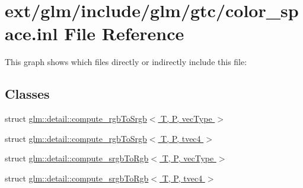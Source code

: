 \hypertarget{gtc_2color__space_8inl}{\section{ext/glm/include/glm/gtc/color\-\_\-space.inl File Reference}
\label{gtc_2color__space_8inl}
}
This graph shows which files directly or indirectly include this file\-:
\subsection*{Classes}
\begin{DoxyCompactItemize}
\item 
struct \hyperlink{structglm_1_1detail_1_1compute__rgb_to_srgb}{glm\-::detail\-::compute\-\_\-rgb\-To\-Srgb$<$ T, P, vec\-Type $>$}
\item 
struct \hyperlink{structglm_1_1detail_1_1compute__rgb_to_srgb_3_01_t_00_01_p_00_01tvec4_01_4}{glm\-::detail\-::compute\-\_\-rgb\-To\-Srgb$<$ T, P, tvec4 $>$}
\item 
struct \hyperlink{structglm_1_1detail_1_1compute__srgb_to_rgb}{glm\-::detail\-::compute\-\_\-srgb\-To\-Rgb$<$ T, P, vec\-Type $>$}
\item 
struct \hyperlink{structglm_1_1detail_1_1compute__srgb_to_rgb_3_01_t_00_01_p_00_01tvec4_01_4}{glm\-::detail\-::compute\-\_\-srgb\-To\-Rgb$<$ T, P, tvec4 $>$}
\end{DoxyCompactItemize}
